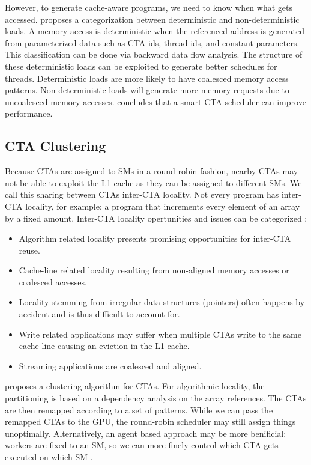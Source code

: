 \documentclass{article}
\begin{document}
However, to generate cache-aware programs, we need to know when what gets accessed.
\citet{koo2015revealing} proposes a categorization between deterministic and non-deterministic loads.
A memory access is deterministic when the referenced address is generated from parameterized data such as CTA ids, thread ids, and constant parameters.
This classification can be done via backward data flow analysis. The structure of these deterministic loads can be exploited to generate better schedules for threads.
Deterministic loads are more likely to have coalesced memory access patterns. 
Non-deterministic loads will generate more memory requests due to uncoalesced memory accesses.
\citet{koo2015revealing} concludes that a smart CTA scheduler can improve performance.

\subsection{CTA Clustering}
Because CTAs are assigned to SMs in a round-robin fashion, nearby CTAs may not be able to exploit the L1 cache as they can be assigned to different SMs.
We call this sharing between CTAs inter-CTA locality.
Not every program has inter-CTA locality, for example: a program that increments every element of an array by a fixed amount.
Inter-CTA locality opertunities and issues can be categorized \cite{li2017locality}:
\begin{itemize}
    \item Algorithm related locality presents promising opportunities for inter-CTA reuse.
    \item Cache-line related locality resulting from non-aligned memory accesses or coalesced accesses.
    \item Locality stemming from irregular data structures (pointers) often happens by accident and is thus difficult to account for.
    \item Write related applications may suffer when multiple CTAs write to the same cache line causing an eviction in the L1 cache.
    \item Streaming applications are coalesced and aligned.
\end{itemize}
\citeauthor{li2017locality} proposes a clustering algorithm for CTAs.
For algorithmic locality, the partitioning is based on a dependency analysis on the array references.
The CTAs are then remapped according to a set of patterns.
While we can pass the remapped CTAs to the GPU, the round-robin scheduler may still assign things unoptimally.
Alternatively, an agent based approach may be more benificial: workers are fixed to an SM, so we can more finely control which CTA gets executed on which SM \cite{li2017locality}.
\end{document}
